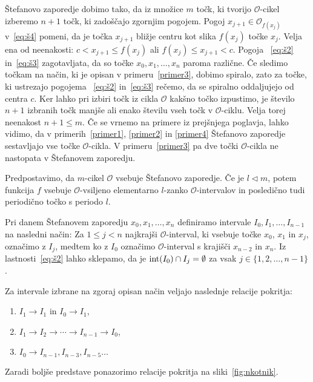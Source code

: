 \documentclass[../TG_magistrsko_delo_sections.tex]{subfiles}
\begin{document}
\begin{opomba}\label{op:štefzap}
Štefanovo zaporedje dobimo tako, da iz množice $m$ točk, ki tvorijo $\mathcal{O}$-cikel izberemo $n+1$ točk, ki zadoščajo zgornjim pogojem. 
Pogoj $x_{j+1} \in \mathcal{O}_{f(x_j)}$ v~\ref{eq:š4} pomeni, da je točka $x_{j+1}$ bližje centru kot slika $f(x_j)$ točke $x_j$. Velja ena od neenakosti: $c < x_{j+1} \leq f(x_j)$ ali $f(x_j) \leq x_{j+1} < c$. Pogoja ~\ref{eq:š2} in~\ref{eq:š3} zagotavljata, da so točke $x_0, x_1, \dots, x_n$ paroma različne. Če sledimo točkam na način, ki je opisan v primeru~\ref{primer3}, dobimo spiralo, zato za točke, ki ustrezajo pogojema ~\ref{eq:š2} in~\ref{eq:š3} rečemo, da se spiralno oddaljujejo od centra $c$. Ker lahko pri izbiri točk iz cikla $\mathcal{O}$ kakšno točko izpustimo, je število $n+1$ izbranih točk manjše ali enako številu vseh točk v $\mathcal{O}$-ciklu. Velja torej neenakost $n+1 \leq m$. Če se vrnemo na primere iz prejšnjega poglavja, lahko vidimo, da v primerih~\ref{primer1}, \ref{primer2} in \ref{primer4} Štefanovo zaporedje sestavljajo vse točke $\mathcal{O}$-cikla. V primeru~\ref{primer3} pa dve točki $\mathcal{O}$-cikla ne nastopata v Štefanovem zaporedju.
\end{opomba}

\begin{trditev}\label{trd:zap-cikel}
Predpostavimo, da $m$-cikel $\mathcal{O}$ vsebuje Štefanovo zaporedje. Če je $l \triangleleft m$, potem funkcija $f$ vsebuje $\mathcal{O}$-vsiljeno elementarno $l$-zanko $\mathcal{O}$-intervalov in posledično tudi periodično točko s periodo $l$.
\end{trditev}

Pri danem Štefanovem zaporedju $x_0, x_1, \dots, x_n$ definiramo intervale $I_0, I_1, \dots, I_{n-1}$ na  nasledni način: Za $1 \leq j < n$ najkrajši $\mathcal{O}$-interval, ki vsebuje točke $x_0$, $x_1$ in $x_j$, označimo z $I_j$, medtem ko z $I_0$ označimo $\mathcal{O}$-interval s krajišči $x_{n-2}$ in $x_n$. Iz lastnosti~\ref{eq:š2} lahko sklepamo, da je $\operatorname{int}(I_0) \cap I_j = \emptyset$ za vsak $j \in \{1, 2, \dots, n-1\}$.

\begin{trditev}\label{trd:pokritja}
Za intervale izbrane na zgoraj opisan način veljajo naslednje relacije pokritja:
\begin{enumerate}[label={(\arabic*)}]
\item $I_1 \to I_1$ in $I_0 \to I_1$,\label{trd:pokritja1}
\item $I_1 \to I_2 \to \cdots \to I_{n-1} \to I_0$,\label{trd:pokritja2}
\item $I_0 \to I_{n-1}, I_{n-3}, I_{n-5} \dots $\label{trd:pokritja3}
\end{enumerate}
Zaradi boljše predstave ponazorimo relacije pokritja na sliki~\ref{fig:nkotnik}.
\end{trditev}
\end{document}
